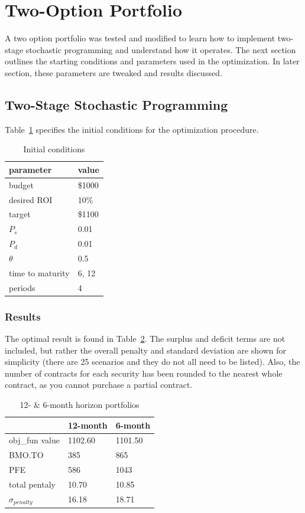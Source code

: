 \documentclass[12pt]{article}
\begin{document}
\section{Two-Option Portfolio}
\label{sec:two_opt_port}
A two option portfolio was tested and modified to learn how to implement two-stage stochastic programming and understand how it operates. The next section outlines the starting conditions and parameters used in the optimization. In later section, these parameters are tweaked and results discussed.

\subsection{Two-Stage Stochastic Programming}
Table~\ref{tab:init_cond} specifies the initial conditions for the optimization procedure.

\begin{table}[H]
	\centering
    \begin{tabular}{|l|l|}
    \hline
    	\textbf{parameter} & \textbf{value} \\ \hline
    	budget & \$1000 \\ \hline
	desired ROI & 10\% \\ \hline
	target & \$1100 \\ \hline
	$P_s$ & 0.01 \\ \hline
	$P_d$ & 0.01 \\ \hline
	$\theta$ & 0.5 \\ \hline
	time to maturity & 6, 12 \\ \hline
	periods & 4 \\ \hline
    \end{tabular}
    \caption {Initial conditions}
    \label{tab:init_cond}
\end{table}

\subsubsection{Results}
The optimal result is found in Table~\ref{tab:result_pen}.
The surplus and deficit terms are not included, but rather the overall penalty and standard deviation are shown for simplicity (there are 25 scenarios and they do not all need to be listed).
Also, the number of contracts for each security has been rounded to the nearest whole contract, as you cannot purchase a partial contract.

\begin{table}[H]
	\centering
    \begin{tabular}{|l|l|l|}
    \hline
    	~ & \textbf{12-month} & \textbf{6-month} \\ \hline
    	obj\_fun value & 1102.60 & 1101.50 \\ \hline
	BMO.TO & 385 & 865 \\ \hline
	PFE & 586 & 1043 \\ \hline
	total pentaly & 10.70 & 10.85 \\ \hline
	$\sigma_{penalty}$ & 16.18 & 18.71 \\ \hline
    \end{tabular}
    \caption {12- \& 6-month horizon portfolios}
    \label{tab:result_pen}
\end{table}
\end{document}
